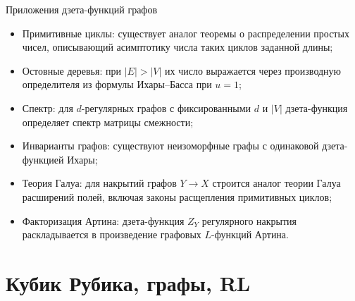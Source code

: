 \documentclass[serif, aspectratio=169]{beamer}
\begin{document}
\begin{frame}{Приложения дзета-функций графов}
    \begin{itemize}
        \item Примитивные циклы: существует аналог теоремы о распределении простых чисел, описывающий асимптотику числа таких циклов заданной длины;
        \item Остовные деревья: при $|E|>|V|$ их число выражается через производную определителя из формулы Ихары--Басса при $u=1$;
        \item Спектр: для $d$-регулярных графов с фиксированными $d$ и $|V|$ дзета-функция определяет спектр матрицы смежности;
        \item Инварианты графов: существуют неизоморфные графы с одинаковой дзета-функцией Ихары;
        \item Теория Галуа: для накрытий графов $Y\to X$ строится аналог теории Галуа расширений полей, включая законы расщепления примитивных циклов;
        \item Факторизация Артина: дзета-функция $Z_Y$ регулярного накрытия раскладывается в произведение графовых $L$-функций Артина.
    \end{itemize}
\end{frame}

\section{Кубик Рубика, графы, RL}
\end{document}
